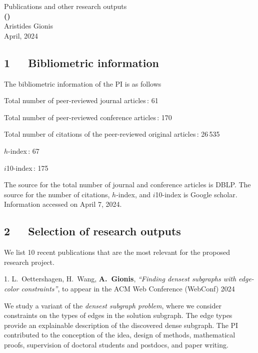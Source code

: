 \documentclass[a4paper,11pt]{article}
\begin{document}
\begin{center} 
{\Large Publications and other research outputs} \vspace{3mm}\\
{\Large\bf {\proposaltitle} {\sc (}{\acronymtitle}{\sc )}}  \vspace{3mm} \\
{\Large Aristides Gionis}  \vspace{2.5mm} \\
{\large April, 2024}
\end{center}

\subsection*{1~~~Bibliometric information}

The bibliometric information of the PI is as follows

\smallskip

Total number of peer-reviewed journal articles\,: 61

Total number of peer-reviewed conference articles\,: 170

Total number of citations of the peer-reviewed original articles\,: 26\,535	

$h$-index\,: 67

$i$10-index\,: 175

\smallskip
\noindent
The source for the total number of journal and conference articles is DBLP.
The source for the number of citations, $h$-index, and $i$10-index is Google scholar. 
Information accessed on April 7, 2024.

\subsection*{2~~~Selection of research outputs}

We list 10 recent publications that are the most relevant for the proposed research project. 
\medskip

\biblistn


\item[{1.}]
{L.\ Oettershagen, H.\ Wang, \textbf{A.\ Gionis}},
{\em ``Finding densest subgraphs with edge-color constraints''},
to appear in the ACM Web Conference (WebConf) 2024
%
\item[]
We study a variant of the \emph{densest subgraph problem}, 
where we consider constraints on the types of edges in the solution subgraph.
The edge types provide an explainable description of the discovered dense subgraph.
The PI contributed to the conception of the idea, 
design of methods, mathematical proofs, supervision of doctoral students and postdocs, and paper writing.
\end{document}
